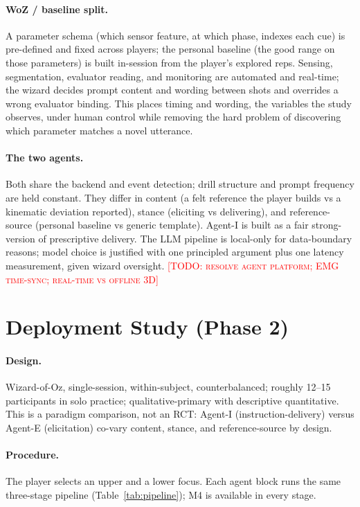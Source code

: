 \documentclass[sigconf]{acmart}
\newcommand{\vf}[1]{\textcolor{red}{[\textsc{#1}]}}
\begin{document}
\paragraph{WoZ / baseline split.} A parameter schema (which sensor feature, at which phase, indexes each cue) is pre-defined and fixed across players; the personal baseline (the good range on those parameters) is built in-session from the player's explored reps. Sensing, segmentation, evaluator reading, and monitoring are automated and real-time; the wizard decides prompt content and wording between shots and overrides a wrong evaluator binding. This places timing and wording, the variables the study observes, under human control while removing the hard problem of discovering which parameter matches a novel utterance.

\paragraph{The two agents.} Both share the backend and event detection; drill structure and prompt frequency are held constant. They differ in content (a felt reference the player builds vs a kinematic deviation reported), stance (eliciting vs delivering), and reference-source (personal baseline vs generic template). Agent-I is built as a fair strong-version of prescriptive delivery. The LLM pipeline is local-only for data-boundary reasons; model choice is justified with one principled argument plus one latency measurement, given wizard oversight. \vf{TODO: resolve agent platform; EMG time-sync; real-time vs offline 3D}

\section{Deployment Study (Phase 2)}

\paragraph{Design.} Wizard-of-Oz, single-session, within-subject, counterbalanced; roughly 12--15 participants in solo practice; qualitative-primary with descriptive quantitative. This is a paradigm comparison, not an RCT: Agent-I (instruction-delivery) versus Agent-E (elicitation) co-vary content, stance, and reference-source by design.

\paragraph{Procedure.} The player selects an upper and a lower focus. Each agent block runs the same three-stage pipeline (Table~\ref{tab:pipeline}); M4 is available in every stage.
\end{document}
